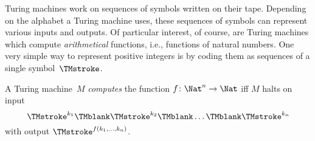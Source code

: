 \documentclass[../../include/open-logic-section]{subfiles}
\begin{document}

\begin{explain}
Turing machines work on sequences of symbols written on their tape.
Depending on the alphabet a Turing machine uses, these sequences of
symbols can represent various inputs and outputs.  Of particular
interest, of course, are Turing machines which compute
\emph{arithmetical} functions, i.e., functions of natural numbers.
One very simple way to represent positive integers is by coding them
as sequences of a single symbol~$\TMstroke$.
\end{explain}

\begin{defn}
A Turing machine~$M$ \emph{computes} the function $f\colon \Nat^n \to \Nat$ iff
$M$ halts on input
\[
\TMstroke^{k_1} \TMblank \TMstroke^{k_2} \TMblank \dots \TMblank \TMstroke^{k_n}
\]
with output $\TMstroke^{f(k_1, \dots, k_n)}$.
\end{defn}

\end{document}

